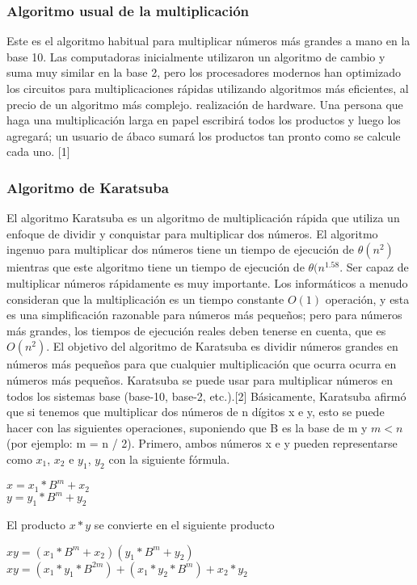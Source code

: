\documentclass[12pt,twoside]{article}
\begin{document}
\subsubsection{Algoritmo usual de la multiplicación}
Este es el algoritmo habitual para multiplicar números más grandes a mano en la base 10. Las computadoras inicialmente utilizaron un algoritmo de cambio y suma muy similar en la base 2, pero los procesadores modernos han optimizado los circuitos para multiplicaciones rápidas utilizando algoritmos más eficientes, al precio de un algoritmo más complejo. realización de hardware. Una persona que haga una multiplicación larga en papel escribirá todos los productos y luego los agregará; un usuario de ábaco sumará los productos tan pronto como se calcule cada uno. [1]
\subsubsection{Algoritmo de Karatsuba}
El algoritmo Karatsuba es un algoritmo de multiplicación rápida que utiliza un enfoque de dividir y conquistar para multiplicar dos números. El algoritmo ingenuo para multiplicar dos números tiene un tiempo de ejecución de $\theta(n^2)$ mientras que este algoritmo tiene un tiempo de ejecución de $\theta(n^{1.58}$. Ser capaz de multiplicar números rápidamente es muy importante. Los informáticos a menudo consideran que la multiplicación es un tiempo constante $O(1)$ operación, y esta es una simplificación razonable para números más pequeños; pero para números más grandes, los tiempos de ejecución reales deben tenerse en cuenta, que es $O(n^2)$. El objetivo del algoritmo de Karatsuba es dividir números grandes en números más pequeños para que cualquier multiplicación que ocurra ocurra en números más pequeños. Karatsuba se puede usar para multiplicar números en todos los sistemas base (base-10, base-2, etc.).[2]\newline\newline
Básicamente, Karatsuba afirmó que si tenemos que multiplicar dos números de n dígitos x e y, esto se puede hacer con las siguientes operaciones, suponiendo que B es la base de m y $m < n$ (por ejemplo: m = n / 2). Primero, ambos números x e y pueden representarse como $x_1$, $x_2$ e $y_1$, $y_2$ con la siguiente fórmula.
\begin{center}
    $x = x_1 * B^m + x_2$\\
    $y = y_1 * B^m + y_2$
\end{center}
El producto $x*y$ se convierte en el siguiente producto
\begin{center}
    $xy = (x_1*B^m+x_2)(y_1*B^m+y_2)$\\
    $xy = (x_1*y_1*B^{2m}) + (x_1*y_2*B^m) + x_2*y_2$
\end{center}
\end{document}
